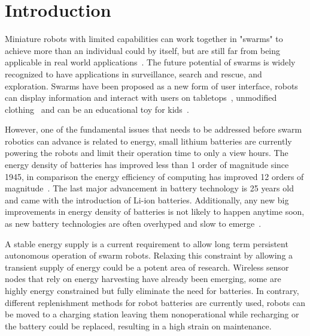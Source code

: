 \chapter{Introduction}
\label{chp:introduction}



Miniature robots with limited capabilities can work together in "swarms" to achieve more than an individual could by itself, but are still far from being applicable in real world applications~\cite{barca_sekercioglu_2013}.
The future potential of swarms is widely recognized to have applications in surveillance, search and rescue, and exploration.
Swarms have been proposed as a new form of user interface, robots can display information and interact with users on tabletops~\cite{legoc_uist_2016}, unmodified clothing~\cite{dementyev_uist_2016} and can be an educational toy for kids~\cite{sony_toio_2017}.
\hfill \break


However, one of the fundamental issues that needs to be addressed before swarm robotics can advance is related to energy, small lithium batteries are currently powering the robots and limit their operation time to only a view hours. 
The energy density of batteries has improved less than 1 order of magnitude since 1945, in comparison the energy efficiency of computing has improved 12 orders of magnitude~\cite{patel_pvc_2017}.
The last major advancement in battery technology is 25 years old and came with the introduction of Li-ion batteries.
Additionally, any new big improvements in energy density of batteries is not likely to happen anytime soon, as new battery technologies are often overhyped and slow to emerge~\cite{zachary_spec_2016}.
\hfill \break



A stable energy supply is a current requirement to allow long term persistent autonomous operation of swarm robots.
Relaxing this constraint by allowing a transient supply of energy could be a potent area of research.
Wireless sensor nodes that rely on energy harvesting have already been emerging, some are highly energy constrained but fully eliminate the need for batteries.
In contrary, different replenishment methods for robot batteries are currently used, robots can be moved to a charging station leaving them nonoperational while recharging or the battery could be replaced, resulting in a high strain on maintenance.


